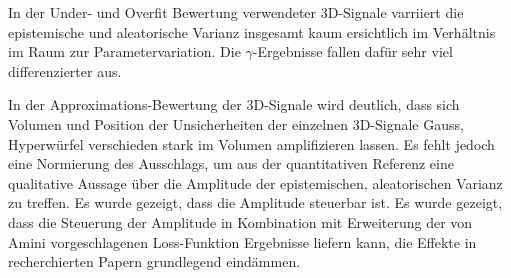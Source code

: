 
In der Under- und Overfit Bewertung verwendeter 3D-Signale varriiert die epistemische und aleatorische Varianz insgesamt kaum ersichtlich im Verhältnis im Raum zur Parametervariation. Die $\gamma$-Ergebnisse fallen dafür sehr viel differenzierter aus. 

In der Approximations-Bewertung der 3D-Signale wird deutlich, dass sich Volumen und Position der Unsicherheiten der einzelnen 3D-Signale Gauss, Hyperwürfel verschieden stark im Volumen amplifizieren lassen. Es fehlt jedoch eine Normierung des Ausschlags, um aus der quantitativen Referenz eine qualitative Aussage über die Amplitude der epistemischen, aleatorischen Varianz zu treffen. Es wurde gezeigt, dass die Amplitude steuerbar ist. Es wurde gezeigt, dass die Steuerung der Amplitude in Kombination mit Erweiterung der von Amini vorgeschlagenen  Loss-Funktion Ergebnisse liefern kann, die Effekte in recherchierten Papern grundlegend eindämmen.